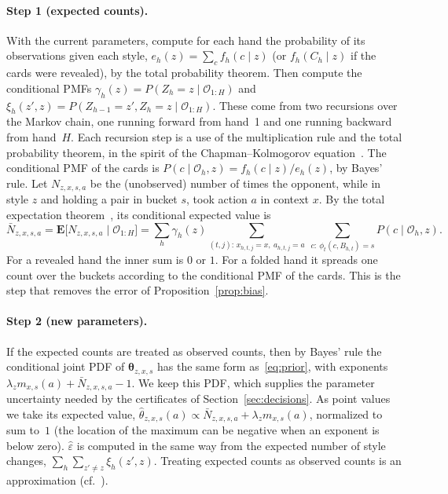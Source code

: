 \documentclass[11pt,a4paper]{article}
\newcommand{\C}{C}            %
\newcommand{\Z}{Z}            %
\newcommand{\B}{B}            %
\newcommand{\E}{\mathbf{E}}
\newcommand{\1}{\mathbf{1}}
\newcommand{\BT}[1]{\cite[§#1]{bertsekas2000}}
\begin{document}
\paragraph{Step 1 (expected counts).} With the current parameters, compute for
each hand the probability of its observations given each style,
$e_h(z)=\sum_{c} f_h(c\mid z)$ (or $f_h(\C_h\mid z)$ if the cards were revealed),
by the total probability theorem. Then compute the conditional PMFs
$\gamma_h(z)=P(\Z_h=z\mid\mathcal{O}_{1:H})$ and
$\xi_h(z',z)=P(\Z_{h-1}=z',\Z_h=z\mid\mathcal{O}_{1:H})$. These come from two
recursions over the Markov chain, one running forward from hand~1 and one
running backward from hand~$H$. Each recursion step is a use of the
multiplication rule and the total probability theorem, in the spirit of the
Chapman--Kolmogorov equation~\BT{6.1}. The conditional PMF of the cards is
$P(c\mid\mathcal{O}_h,z)=f_h(c\mid z)/e_h(z)$, by Bayes' rule. Let
$N_{z,x,s,a}$ be the (unobserved) number of times the opponent, while in style
$z$ and holding a pair in bucket $s$, took action $a$ in context $x$. By the
total expectation theorem~\BT{2.6}, its conditional expected value is
\begin{equation}
  \bar N_{z,x,s,a}=\E\big[N_{z,x,s,a}\mid\mathcal{O}_{1:H}\big]
  =\sum_h\gamma_h(z)\sum_{(t,j):\,x_{h,t,j}=x,\ a_{h,t,j}=a}
  \ \sum_{c:\ \phi_t(c,\B_{h,t})=s} P(c\mid\mathcal{O}_h,z).
  \label{eq:counts}
\end{equation}
For a revealed hand the inner sum is $0$ or $1$. For a folded hand it spreads
one count over the buckets according to the conditional PMF of the cards.
This is the step that removes the error of Proposition~\ref{prop:bias}.

\paragraph{Step 2 (new parameters).} If the expected counts are treated as
observed counts, then by Bayes' rule the conditional joint PDF of
$\bm\theta_{z,x,s}$ has the same form as~\eqref{eq:prior}, with exponents
$\lambda_z m_{x,s}(a)+\bar N_{z,x,s,a}-1$. We keep this PDF, which supplies the
parameter uncertainty needed by the certificates of Section~\ref{sec:decisions}.
As point values we take its expected value,
$\hat\theta_{z,x,s}(a)\propto \bar N_{z,x,s,a}+\lambda_z m_{x,s}(a)$,
normalized to sum to~$1$ (the location of the maximum can be negative when an
exponent is below zero). $\hat\varepsilon$ is computed in the same way from the
expected number of style changes, $\sum_h\sum_{z'\neq z}\xi_h(z',z)$. Treating
expected counts as observed counts is an approximation (cf.~\cite{beal2003}).
\end{document}
